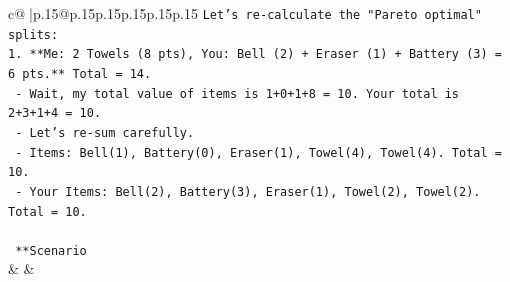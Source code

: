\documentclass{article}
\begin{document}
{\begin{supertabular}{c@{$\;$}|p{.15\linewidth}@{}p{.15\linewidth}p{.15\linewidth}p{.15\linewidth}p{.15\linewidth}p{.15\linewidth}}
{{{\texttt{Let's re{-}calculate the "Pareto optimal" splits:} \\
\texttt{1. **Me: 2 Towels (8 pts), You: Bell (2) + Eraser (1) + Battery (3) = 6 pts.** Total = 14.} \\
\texttt{   {-} Wait, my total value of items is 1+0+1+8 = 10. Your total is 2+3+1+4 = 10.} \\
\texttt{   {-} Let's re{-}sum carefully.} \\
\texttt{   {-} Items: Bell(1), Battery(0), Eraser(1), Towel(4), Towel(4). Total = 10.} \\
\texttt{   {-} Your Items: Bell(2), Battery(3), Eraser(1), Towel(2), Towel(2). Total = 10.} \\
\\ 
\texttt{   **Scenario} \\
            }
        }
    }
    & & \\ \\


\end{supertabular}}
\end{document}

